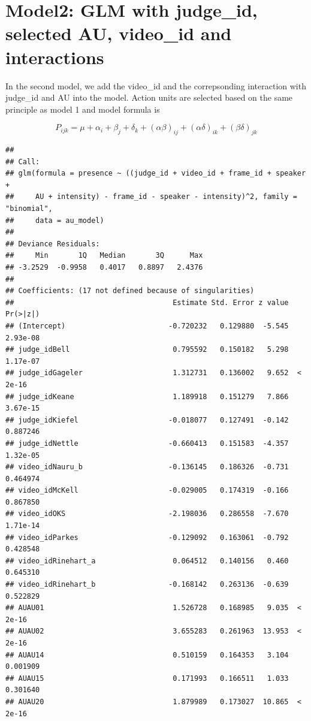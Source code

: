 \documentclass{monashthesis}
\begin{document}
\hypertarget{model2-glm-with-judge_id-selected-au-video_id-and-interactions}{%
\section{Model2: GLM with judge\_id, selected AU, video\_id and interactions}\label{model2-glm-with-judge_id-selected-au-video_id-and-interactions}}

In the second model, we add the video\_id and the correpsonding interaction with judge\_id and AU into the model. Action units are selected based on the same principle as model 1 and model formula is

\[P_{ijk} = \mu + \alpha_i + \beta_j +\delta_k + (\alpha\beta)_{ij}+(\alpha\delta)_{ik} + (\beta\delta)_{jk}\]

\begin{verbatim}
## 
## Call:
## glm(formula = presence ~ ((judge_id + video_id + frame_id + speaker + 
##     AU + intensity) - frame_id - speaker - intensity)^2, family = "binomial", 
##     data = au_model)
## 
## Deviance Residuals: 
##     Min       1Q   Median       3Q      Max  
## -3.2529  -0.9958   0.4017   0.8897   2.4376  
## 
## Coefficients: (17 not defined because of singularities)
##                                     Estimate Std. Error z value Pr(>|z|)
## (Intercept)                        -0.720232   0.129880  -5.545 2.93e-08
## judge_idBell                        0.795592   0.150182   5.298 1.17e-07
## judge_idGageler                     1.312731   0.136002   9.652  < 2e-16
## judge_idKeane                       1.189918   0.151279   7.866 3.67e-15
## judge_idKiefel                     -0.018077   0.127491  -0.142 0.887246
## judge_idNettle                     -0.660413   0.151583  -4.357 1.32e-05
## video_idNauru_b                    -0.136145   0.186326  -0.731 0.464974
## video_idMcKell                     -0.029005   0.174319  -0.166 0.867850
## video_idOKS                        -2.198036   0.286558  -7.670 1.71e-14
## video_idParkes                     -0.129092   0.163061  -0.792 0.428548
## video_idRinehart_a                  0.064512   0.140156   0.460 0.645310
## video_idRinehart_b                 -0.168142   0.263136  -0.639 0.522829
## AUAU01                              1.526728   0.168985   9.035  < 2e-16
## AUAU02                              3.655283   0.261963  13.953  < 2e-16
## AUAU14                              0.510159   0.164353   3.104 0.001909
## AUAU15                              0.171993   0.166511   1.033 0.301640
## AUAU20                              1.879989   0.173027  10.865  < 2e-16

\end{verbatim}
\end{document}
